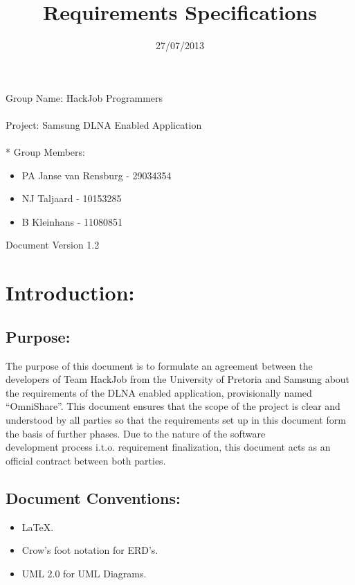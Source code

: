 \documentclass[12pt]{article}
\title{Requirements Specifications}
\date{27/07/2013}
\begin{document}
  \maketitle
\begin{tabbing}
Group Name: \= HackJob Programmers
\\~
\\Project: Samsung DLNA Enabled Application
\\~
  \\* Group Members:
\end{tabbing}
	
	\begin{itemize}
	\item PA Janse van Rensburg - 29034354
	\item NJ Taljaard - 10153285
	\item B Kleinhans - 11080851
	\end{itemize}

Document Version 1.2

\newpage
\section{Introduction:}
\subsection{Purpose:}

The purpose of this document is to formulate an agreement between the developers of Team HackJob from the University of Pretoria and Samsung about the requirements of the DLNA enabled application, provisionally named “OmniShare”.  This document ensures that the scope of the project is clear and understood by all parties so that the requirements set up in this document form the basis of further phases. Due to the nature of the software
\\ development process i.t.o. requirement finalization, this document acts as an official contract between both parties.

\subsection{Document Conventions:}
\begin{itemize}
\item LaTeX.
\item Crow's foot notation for ERD's.
\item UML 2.0 for UML Diagrams.
\end{itemize}
\end{document}

